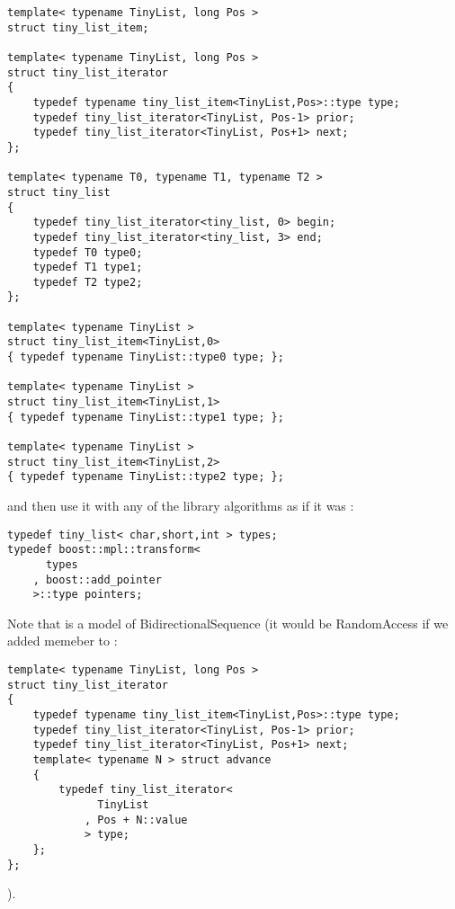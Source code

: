 \documentclass{netobjectdays}
\begin{document}
{\footnotesize
\begin{verbatim}
template< typename TinyList, long Pos >
struct tiny_list_item;

template< typename TinyList, long Pos >
struct tiny_list_iterator
{
    typedef typename tiny_list_item<TinyList,Pos>::type type;
    typedef tiny_list_iterator<TinyList, Pos-1> prior;
    typedef tiny_list_iterator<TinyList, Pos+1> next;
};

template< typename T0, typename T1, typename T2 >
struct tiny_list
{
    typedef tiny_list_iterator<tiny_list, 0> begin;
    typedef tiny_list_iterator<tiny_list, 3> end;
    typedef T0 type0;
    typedef T1 type1;
    typedef T2 type2;
};

template< typename TinyList >
struct tiny_list_item<TinyList,0>
{ typedef typename TinyList::type0 type; };

template< typename TinyList >
struct tiny_list_item<TinyList,1>
{ typedef typename TinyList::type1 type; };

template< typename TinyList >
struct tiny_list_item<TinyList,2>
{ typedef typename TinyList::type2 type; };
\end{verbatim}
}

and then use it with any of the library algorithms as if it 
was :

{\footnotesize
\begin{verbatim}
typedef tiny_list< char,short,int > types;
typedef boost::mpl::transform<
      types
    , boost::add_pointer
    >::type pointers;
\end{verbatim}
}

Note that  is a model of 
BidirectionalSequence (it would be RandomAccess if 
we added  memeber to :

{\footnotesize
\begin{verbatim}
template< typename TinyList, long Pos >
struct tiny_list_iterator
{
    typedef typename tiny_list_item<TinyList,Pos>::type type;
    typedef tiny_list_iterator<TinyList, Pos-1> prior;
    typedef tiny_list_iterator<TinyList, Pos+1> next;
    template< typename N > struct advance
    {
        typedef tiny_list_iterator<
              TinyList
            , Pos + N::value
            > type;
    };
};
\end{verbatim}
}

).
\end{document}
